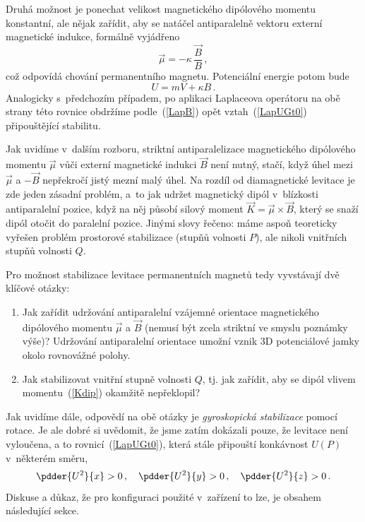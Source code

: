 Druhá možnost je ponechat velikost magnetického dipólového momentu konstantní,
ale nějak zařídit, aby se natáčel antiparalelně vektoru externí magnetické
indukce, formálně vyjádřeno
\begin{equation}
  \vec{\mu} = -\kappa\,\frac{\vec{B}}{B}\,,                   \label{muPropDirB}
\end{equation}
což odpovídá chování permanentního magnetu. Potenciální energie potom bude
\begin{equation}
  U = mV +\kappa B\,.                                             \label{permaU}
\end{equation}
Analogicky s~předchozím případem, po aplikaci Laplaceova operátoru na obě
strany této rovnice obdržíme podle~(\ref{LapB}) opět vztah~(\ref{LapUGt0})
připouštějící stabilitu.

Jak uvidíme v~dalším rozboru, striktní antiparalelizace magnetického dipólového
momentu $\vec{\mu}$ vůči externí magnetické indukci $\vec{B}$ není nutný,
stačí, když úhel mezi $\vec{\mu}$ a $-\vec{B}$ nepřekročí jistý mezní malý
úhel. Na rozdíl od diamagnetické levitace je zde jeden zásadní problém, a~to
jak udržet magnetický dipól v~blízkosti antiparalelní pozice, když na něj
působí silový moment $\vec{K} = \vec{\mu}\times\vec{B}$, který se snaží dipól
otočit do paralelní pozice. Jinými slovy řečeno: máme aspoň teoreticky vyřešen
problém prostorové stabilizace (stupňů volnosti $P$), ale nikoli vnitřních
stupňů volnosti $Q$.

Pro možnost stabilizace levitace permanentních magnetů tedy vyvstávají
dvě klíčové otázky:
\begin{enumerate}
\item Jak zařídit udržování antiparalelní vzájemné orientace magnetického
  dipólového momentu $\vec{\mu}$ a $\vec{B}$ (nemusí být zcela striktní ve
  smyslu poznámky výše)? Udržování antiparalelní orientace umožní vznik 3D
  potenciálové jamky okolo rovnovážné polohy.
\item Jak stabilizovat vnitřní stupně volnosti $Q$, tj. jak zařídit, aby se
  dipól vlivem momentu~(\ref{Kdip}) okamžitě nepřeklopil?
\end{enumerate}

\noindent
Jak uvidíme dále, odpovědí na obě otázky je \emph{gyroskopická stabilizace}
pomocí rotace. Je ale dobré si uvědomit, že jsme zatím dokázali pouze, že
levitace není vyloučena, a to rovnicí~(\ref{LapUGt0}), která stále připouští
konkávnost $U(P)$ v~některém směru,
\begin{equation}
\pdder{U^{2}}{x}>0\,,\quad
\pdder{U^{2}}{y}>0\,,\quad
\pdder{U^{2}}{z}>0\,.                                              \label{E4re}
\end{equation}
Diskuse a důkaz, že pro konfiguraci použité v~zařízení \Levit{} to lze, je
obsahem následující sekce.


